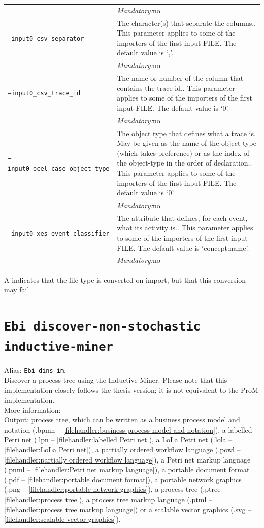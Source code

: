 {\begin{tabularx}{\linewidth}{lX}
&\textit{Mandatory:}\quad no\\
\texttt{--input0\_csv\_separator} & The character(s) that separate the columns.. This parameter applies to some of the importers of the first input FILE. The default value is `,'.\\
&\textit{Mandatory:}\quad no\\
\texttt{--input0\_csv\_trace\_id} & The name or number of the column that contains the trace id.. This parameter applies to some of the importers of the first input FILE. The default value is `0'.\\
&\textit{Mandatory:}\quad no\\
\texttt{--input0\_ocel\_case\_object\_type} & The object type that defines what a trace is. May be given as the name of the object type (which takes preference) or as the index of the object-type in the order of declaration.. This parameter applies to some of the importers of the first input FILE. The default value is `0'.\\
&\textit{Mandatory:}\quad no\\
\texttt{--input0\_xes\_event\_classifier} & The attribute that defines, for each event, what its activity is.. This parameter applies to some of the importers of the first input FILE. The default value is `concept:name'.\\
&\textit{Mandatory:}\quad no\\
\bottomrule
\end{tabularx}
A \textdagger{} indicates that the file type is converted on import, but that this conversion may fail.
\clearpage\section{\texttt{Ebi discover-non-stochastic inductive-miner}}
\label{command:Ebi discover-non-stochastic inductive-miner}
Alias: \texttt{Ebi dins im}.\\
Discover a process tree using the Inductive Miner.
    Please note that this implementation closely follows the thesis version; it is not equivalent to the ProM implementation.\\
More information: \cite{DBLP:series/lnbip/Leemans22}~\\
\noindent Output: process tree, which can be written as a business process model and notation (.bpmn -- \cref{filehandler:business process model and notation}), a labelled Petri net (.lpn -- \cref{filehandler:labelled Petri net}), a LoLa Petri net (.lola -- \cref{filehandler:LoLa Petri net}), a partially ordered workflow language (.powl -- \cref{filehandler:partially ordered workflow language}), a Petri net markup language (.pnml -- \cref{filehandler:Petri net markup language}), a portable document format (.pdf -- \cref{filehandler:portable document format}), a portable network graphics (.png -- \cref{filehandler:portable network graphics}), a process tree (.ptree -- \cref{filehandler:process tree}), a process tree markup language (.ptml -- \cref{filehandler:process tree markup language}) or a scalable vector graphics (.svg -- \cref{filehandler:scalable vector graphics}).\\
}
